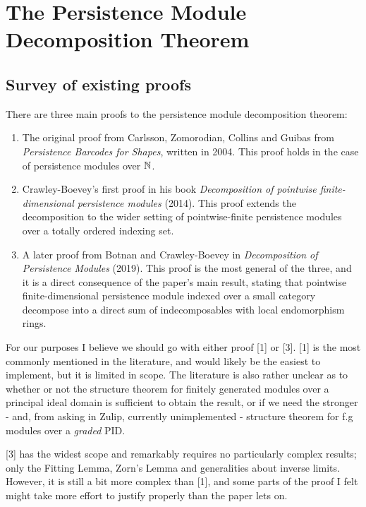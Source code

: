 

\chapter{The Persistence Module Decomposition Theorem}

\section{Survey of existing proofs}

There are three main proofs to the persistence module decomposition theorem: 

\begin{enumerate}
	\item The original proof from Carlsson, Zomorodian, Collins and Guibas from \textit{Persistence Barcodes for Shapes}, written in 2004. This proof holds in the case of persistence modules over $\mathbb{N}$.  
	\item Crawley-Boevey's first proof in his book \textit{Decomposition of pointwise finite-dimensional persistence modules} (2014). This proof extends the decomposition to the wider setting of pointwise-finite persistence modules over a totally ordered indexing set. 
	\item A later proof from Botnan and Crawley-Boevey in \textit{Decomposition of Persistence Modules} (2019). This proof is the most general of the three, and it is a direct consequence of the paper's main result, stating that pointwise finite-dimensional persistence module indexed over a small category decompose into a direct sum of indecomposables with local endomorphism rings.
\end{enumerate}

For our purposes I believe we should go with either proof [1] or [3]. [1] is the most commonly mentioned in the literature, and would likely be the easiest to implement, but it is limited in scope. The literature is also rather unclear as to whether or not the structure theorem for finitely generated modules over a principal ideal domain is sufficient to obtain the result, or if we need the stronger - and, from asking in Zulip, currently unimplemented - structure theorem for f.g modules over a \textit{graded} PID. 

[3] has the widest scope and remarkably requires no particularly complex results; only the Fitting Lemma, Zorn's Lemma and generalities about inverse limits. However, it is still a bit more complex than [1], and some parts of the proof I felt might take more effort to justify properly than the paper lets on. 

